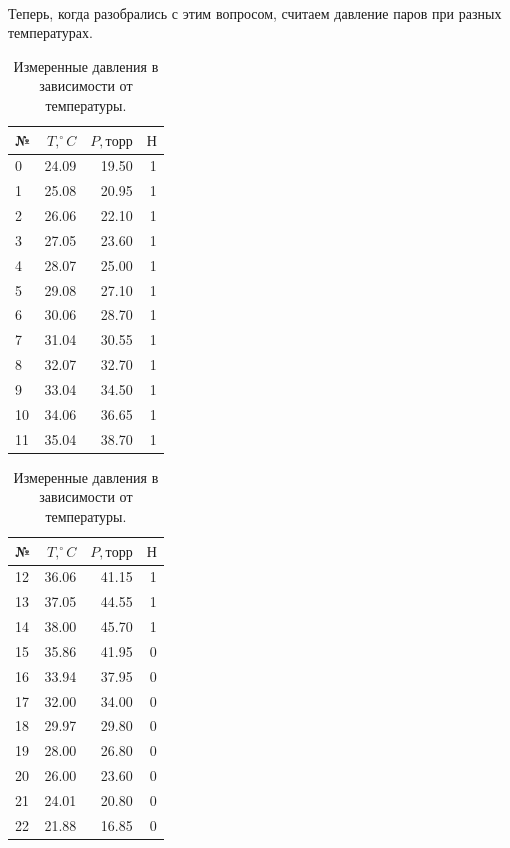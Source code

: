 \documentclass[a4paper, 12pt]{article}
\begin{document}
    \paragraph{}
    Теперь, когда разобрались с этим вопросом, считаем давление паров при разных температурах.
    \begin{table}[h!]
        \vspace{5pt}
        \begin{center}
        \subtable
        {
            \begin{tabular}{|l|rr|r|}
            \hline
            № &    $T, ^\circ C$ & $P, торр$ & $Н$ \\
            \hline
            0  &  24.09 &  19.50 &     1 \\
            1  &  25.08 &  20.95 &     1 \\
            2  &  26.06 &  22.10 &     1 \\
            3  &  27.05 &  23.60 &     1 \\
            4  &  28.07 &  25.00 &     1 \\
            5  &  29.08 &  27.10 &     1 \\
            6  &  30.06 &  28.70 &     1 \\
            7  &  31.04 &  30.55 &     1 \\
            8  &  32.07 &  32.70 &     1 \\
            9  &  33.04 &  34.50 &     1 \\
            10 &  34.06 &  36.65 &     1 \\
            11 &  35.04 &  38.70 &     1 \\
            \hline
            \end{tabular}
        }
        \subtable
        {
            \begin{tabular}{|l|rr|r|}
            \hline
            № &    $T, ^\circ C$ & $P, торр$ & $Н$ \\
            \hline
            12 &  36.06 &  41.15 &     1 \\
            13 &  37.05 &  44.55 &     1 \\
            14 &  38.00 &  45.70 &     1 \\
            15 &  35.86 &  41.95 &     0 \\
            16 &  33.94 &  37.95 &     0 \\
            17 &  32.00 &  34.00 &     0 \\
            18 &  29.97 &  29.80 &     0 \\
            19 &  28.00 &  26.80 &     0 \\
            20 &  26.00 &  23.60 &     0 \\
            21 &  24.01 &  20.80 &     0 \\
            22 &  21.88 &  16.85 &     0 \\
            \hline
            \end{tabular}
        }

        \caption{Измеренные давления в зависимости от температуры.}
        \label{data}
        \end{center}
    \end{table}
\end{document}
